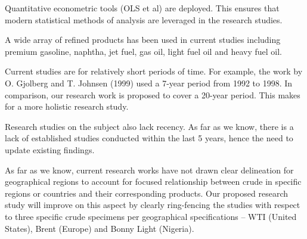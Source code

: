 \documentclass[12pt,twoside]{article}
\begin{document}
\begin{justify}
{\fontsize{11pt}{13.2pt}\selectfont Quantitative econometric tools (OLS et al) are deployed. This ensures that modern statistical methods of analysis are leveraged in the research studies.\par}
\end{justify}\par

\begin{justify}
{\fontsize{11pt}{13.2pt}\selectfont A wide array of refined products has been used in current studies including premium gasoline, naphtha, jet fuel, gas oil, light fuel oil and heavy fuel oil.\par}
\end{justify}\par

{\fontsize{11pt}{13.2pt}\selectfont \par}
\par

\begin{justify}
{\fontsize{11pt}{13.2pt}\selectfont Current studies are for relatively short periods of time. For example, the work by O. Gjolberg and T. Johnsen (1999) used a 7-year period from 1992 to 1998. In comparison, our research work is proposed to cover a 20-year period. This makes for a more holistic research study.\par}
\end{justify}\par

\begin{justify}
{\fontsize{11pt}{13.2pt}\selectfont Research studies on the subject also lack recency. As far as we know, there is a lack of established studies conducted within the last 5 years, hence the need to update existing findings.\par}
\end{justify}\par

\begin{justify}
{\fontsize{11pt}{13.2pt}\selectfont As far as we know, current research works have not drawn clear delineation for geographical regions to account for focused relationship between crude in specific regions or countries and their corresponding products. Our proposed research study will improve on this aspect by clearly ring-fencing the studies with respect to three specific crude specimens per geographical specifications – WTI (United States), Brent (Europe) and Bonny Light (Nigeria).\par}
\end{justify}\par
\end{document}
